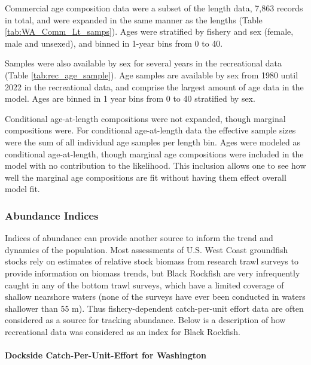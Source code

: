 \documentclass[11pt,
  letterpaper,
]{article}
\begin{document}
Commercial age composition data were a subset of the length data, 7,863 records in total, and were expanded in the same manner as the lengths (Table \ref{tab:WA_Comm_Lt_samps}). Ages were stratified by fishery and sex (female, male and unsexed), and binned in 1-year bins from 0 to 40.

Samples were also available by sex for several years in the recreational data (Table \ref{tab:rec_age_sample}). Age samples are available by sex from 1980 until 2022 in the recreational data, and comprise the largest amount of age data in the model. Ages are binned in 1 year bins from 0 to 40 stratified by sex.

Conditional age-at-length compositions were not expanded, though marginal compositions were. For conditional age-at-length data the effective sample sizes were the sum of all individual age samples per length bin. Ages were modeled as conditional age-at-length, though marginal age compositions were included in the model with no contribution to the likelihood. This inclusion allows one to see how well the marginal age compositions are fit without having them effect overall model fit.

\hypertarget{abundance-indices}{%
\subsubsection{Abundance Indices}\label{abundance-indices}}

Indices of abundance can provide another source to inform the trend and dynamics of the population. Most assessments of U.S. West Coast groundfish stocks rely on estimates of relative stock biomass from research trawl surveys to provide information on biomass trends, but Black Rockfish are very infrequently caught in any of the bottom trawl surveys, which have a limited coverage of shallow nearshore waters (none of the surveys have ever been conducted in waters shallower than 55 m). Thus fishery-dependent catch-per-unit effort data are often considered as a source for tracking abundance. Below is a description of how recreational data was considered as an index for Black Rockfish.

\hypertarget{dockside-catch-per-unit-effort-for-washington}{%
\paragraph{Dockside Catch-Per-Unit-Effort for Washington}\label{dockside-catch-per-unit-effort-for-washington}}
\end{document}
